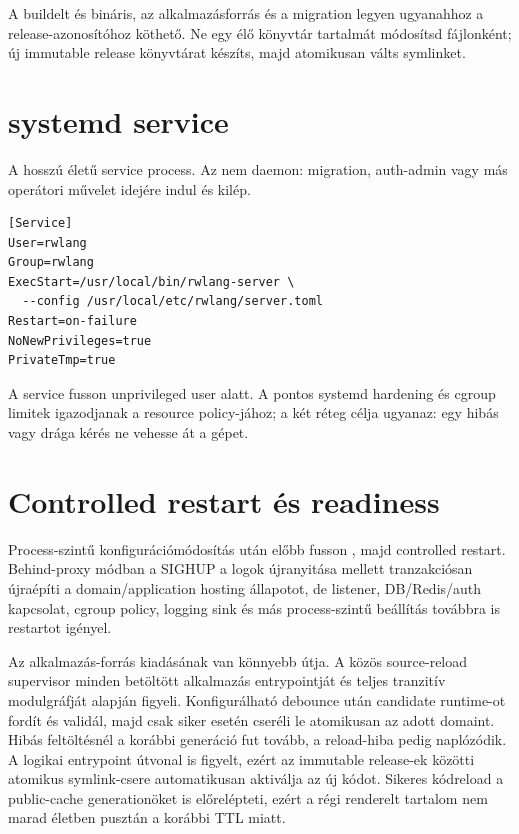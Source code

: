 A buildelt  és  bináris, az alkalmazásforrás és a migration legyen ugyanahhoz a release-azonosítóhoz köthető. Ne egy élő  könyvtár tartalmát módosítsd fájlonként; új immutable release könyvtárat készíts, majd atomikusan válts symlinket.

\section{systemd service}

A  hosszú életű service process. Az  nem daemon: migration, auth-admin vagy más operátori művelet idejére indul és kilép.

\begin{lstlisting}
[Service]
User=rwlang
Group=rwlang
ExecStart=/usr/local/bin/rwlang-server \
  --config /usr/local/etc/rwlang/server.toml
Restart=on-failure
NoNewPrivileges=true
PrivateTmp=true
\end{lstlisting}

A service fusson unprivileged user alatt. A pontos systemd hardening és cgroup limitek igazodjanak a  resource policy-jához; a két réteg célja ugyanaz: egy hibás vagy drága kérés ne vehesse át a gépet.

\section{Controlled restart és readiness}

Process-szintű konfigurációmódosítás után előbb fusson , majd controlled restart. Behind-proxy módban a SIGHUP a logok újranyitása mellett tranzakciósan újraépíti a domain/application hosting állapotot, de listener, DB/Redis/auth kapcsolat, cgroup policy, logging sink és más process-szintű beállítás továbbra is restartot igényel.

Az alkalmazás-forrás kiadásának van könnyebb útja. A közös source-reload supervisor minden betöltött alkalmazás entrypointját és teljes tranzitív modulgráfját  alapján figyeli. Konfigurálható debounce után candidate runtime-ot fordít és validál, majd csak siker esetén cseréli le atomikusan az adott domaint. Hibás feltöltésnél a korábbi generáció fut tovább, a reload-hiba pedig naplózódik. A logikai entrypoint útvonal is figyelt, ezért az immutable release-ek közötti atomikus  symlink-csere automatikusan aktiválja az új kódot. Sikeres kódreload a public-cache generationöket is előrelépteti, ezért a régi renderelt tartalom nem marad életben pusztán a korábbi TTL miatt.

